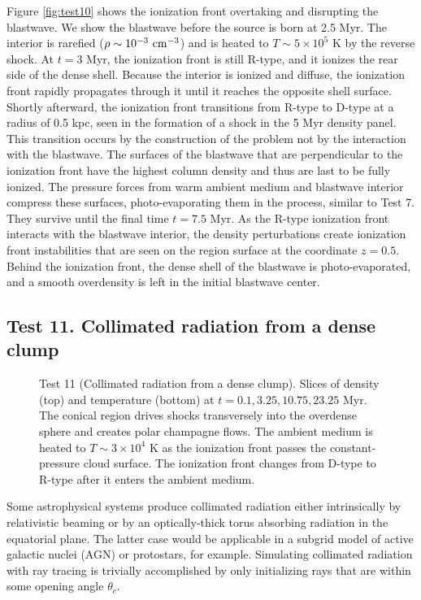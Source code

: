 \documentclass[useAMS,usenatbib,a4paper]{mn2e}
\begin{document}
Figure \ref{fig:test10} shows the ionization front overtaking and
disrupting the blastwave.  We show the blastwave before the source is
born at 2.5 Myr.  The interior is rarefied ($\rho \sim
10^{-3}~\cubecm$) and is heated to $T \sim 5 \times 10^5$ K by the
reverse shock.  At $t = 3$ Myr, the ionization front is still R-type,
and it ionizes the rear side of the dense shell.  Because the interior
is ionized and diffuse, the ionization front rapidly propagates
through it until it reaches the opposite shell surface.  Shortly
afterward, the ionization front transitions from R-type to D-type at a
radius of 0.5 kpc, seen in the formation of a shock in the 5 Myr
density panel.  This transition occurs by the construction of the
problem not by the interaction with the blastwave.  The surfaces of
the blastwave that are perpendicular to the ionization front have the
highest column density and thus are last to be fully ionized.  The
pressure forces from warm ambient medium and blastwave interior
compress these surfaces, photo-evaporating them in the process,
similar to Test 7.  They survive until the final time $t = 7.5$ Myr.
As the R-type ionization front interacts with the blastwave interior,
the density perturbations create ionization front instabilities
\citep{Whalen08_Instab} that are seen on the \hii region surface
at the coordinate $z=0.5$.  Behind the ionization front, the dense
shell of the blastwave is photo-evaporated, and a smooth overdensity
is left in the initial blastwave center.

\subsection{Test 11. Collimated radiation from a dense clump}

\begin{figure*}
  \caption{\label{fig:test11} Test 11 (Collimated radiation from a
    dense clump).  Slices of density (top) and temperature (bottom) at
    $t = 0.1, 3.25, 10.75, 23.25$ Myr.  The conical \hii region
    drives shocks transversely into the overdense sphere and creates
    polar champagne flows.  The ambient medium is heated to $T \sim 3
    \times 10^4$ K as the ionization front passes the
    constant-pressure cloud surface.  The ionization front changes
    from D-type to R-type after it enters the ambient medium.}
\end{figure*}

Some astrophysical systems produce collimated radiation either
intrinsically by relativistic beaming or by an optically-thick torus
absorbing radiation in the equatorial plane.  The latter case would be
applicable in a subgrid model of active galactic nuclei (AGN) or
protostars, for example.  Simulating collimated radiation with ray
tracing is trivially accomplished by only initializing rays that are
within some opening angle $\theta_c$.
\end{document}
